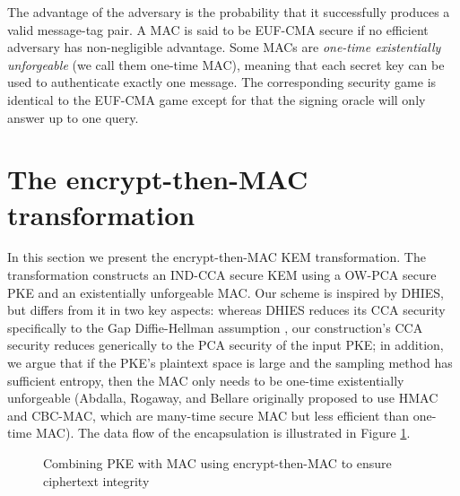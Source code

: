 \documentclass[runningheads]{llncs}
\newcommand{\mac}{\texttt{MAC}}
\newcommand{\pk}{\texttt{pk}}
\newcommand{\leftsample}{\stackrel{\$}{\leftarrow}}
\begin{document}
The advantage of the adversary is the probability that it successfully produces a valid message-tag pair. A MAC is said to be EUF-CMA secure if no efficient adversary has non-negligible advantage. Some MACs are \textit{one-time existentially unforgeable} (we call them one-time MAC), meaning that each secret key can be used to authenticate exactly one message. The corresponding security game is identical to the EUF-CMA game except for that the signing oracle will only answer up to one query.

\section{The encrypt-then-MAC transformation}\label{sec:the-enc-then-mac-transformation}
In this section we present the encrypt-then-MAC KEM transformation. The transformation constructs an IND-CCA secure KEM using a OW-PCA secure PKE and an existentially unforgeable MAC. Our scheme is inspired by DHIES, but differs from it in two key aspects: whereas DHIES reduces its CCA security specifically to the Gap Diffie-Hellman assumption \cite{DBLP:conf/pkc/OkamotoP01}, our construction's CCA security reduces generically to the PCA security of the input PKE; in addition, we argue that if the PKE's plaintext space is large and the sampling method has sufficient entropy, then the MAC only needs to be one-time existentially unforgeable (Abdalla, Rogaway, and Bellare originally proposed to use HMAC and CBC-MAC, which are many-time secure MAC but less efficient than one-time MAC). The data flow of the encapsulation is illustrated in Figure \ref{fig:etm-encap-data-flow}. 

\begin{figure}[h]
    \centering

    \caption{Combining PKE with MAC using encrypt-then-MAC to ensure ciphertext integrity}\label{fig:etm-encap-data-flow}
\end{figure}
\end{document}
